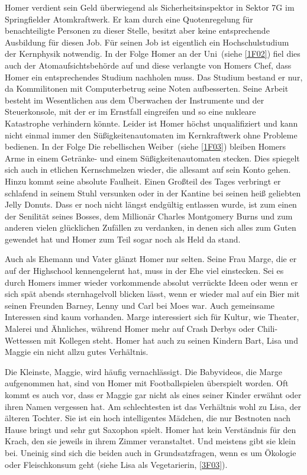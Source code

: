 Homer verdient sein Geld überwiegend als Sicherheitsinspektor in Sektor 7G im Springfielder Atomkraftwerk. Er kam durch eine Quotenregelung für benachteiligte Personen zu dieser Stelle, besitzt aber keine entsprechende Ausbildung für diesen Job. Für seinen Job ist eigentlich ein Hochschulstudium der Kernphysik notwendig. In der Folge \glqq Homer an der Uni\grqq\ (siehe \ref{1F02}) fiel dies auch der Atomaufsichtsbehörde auf und diese verlangte von Homers Chef, dass Homer ein entsprechendes Studium nachholen muss. Das Studium bestand er nur, da Kommilitonen mit Computerbetrug seine Noten aufbesserten. Seine Arbeit besteht im Wesentlichen aus dem Überwachen der Instrumente und der Steuerkonsole, mit der er im Ernstfall eingreifen und so eine nukleare Katastrophe verhindern könnte. Leider ist Homer höchst unqualifiziert und kann nicht einmal immer den Süßigkeitenautomaten im Kernkraftwerk ohne Probleme bedienen. In der Folge \glqq Die rebellischen Weiber\grqq\ (siehe \ref{1F03}) bleiben Homers Arme in einem Getränke- und einem Süßigkeitenautomaten stecken. Dies spiegelt sich auch in etlichen Kernschmelzen wieder, die allesamt auf sein Konto gehen. Hinzu kommt seine absolute Faulheit. Einen Großteil des Tages verbringt er schlafend in seinem Stuhl versunken oder in der Kantine bei seinen heiß geliebten Jelly Donuts. Dass er noch nicht längst endgültig entlassen wurde, ist zum einen der Senilität seines Bosses, dem Millionär Charles Montgomery Burns und zum anderen vielen glücklichen Zufällen zu verdanken, in denen sich alles zum Guten gewendet hat und Homer zum Teil sogar noch als Held da stand.

Auch als Ehemann und Vater glänzt Homer nur selten. Seine Frau Marge, die er auf der Highschool kennengelernt hat, muss in der Ehe viel einstecken. Sei es durch Homers immer wieder vorkommende absolut verrückte Ideen oder wenn er sich spät abends sternhagelvoll blicken lässt, wenn er wieder mal auf ein Bier mit seinen Freunden Barney, Lenny und Carl bei Moes war. Auch gemeinsame Interessen sind kaum vorhanden. Marge interessiert sich für Kultur, wie Theater, Malerei und Ähnliches, während Homer mehr auf Crash Derbys oder Chili-Wettessen mit Kollegen steht. Homer hat auch zu seinen Kindern Bart, Lisa und Maggie ein nicht allzu gutes Verhältnis.

Die Kleinste, Maggie, wird häufig vernachlässigt. Die Babyvideos, die Marge aufgenommen hat, sind von Homer mit Footballspielen überspielt worden. Oft kommt es auch vor, dass er Maggie gar nicht als eines seiner Kinder erwähnt oder ihren Namen vergessen hat. Am schlechtesten ist das Verhältnis wohl zu Lisa, der älteren Tochter. Sie ist ein hoch intelligentes Mädchen, die nur Bestnoten nach Hause bringt und sehr gut Saxophon spielt. Homer hat kein Verständnis für den \glqq Krach\grqq , den sie jeweils in ihrem Zimmer veranstaltet. Und meistens gibt sie klein bei. Uneinig sind sich die beiden auch in Grundsatzfragen, wenn es um Ökologie oder Fleischkonsum geht (siehe \glqq Lisa als Vegetarierin\grqq , \ref{3F03}).

